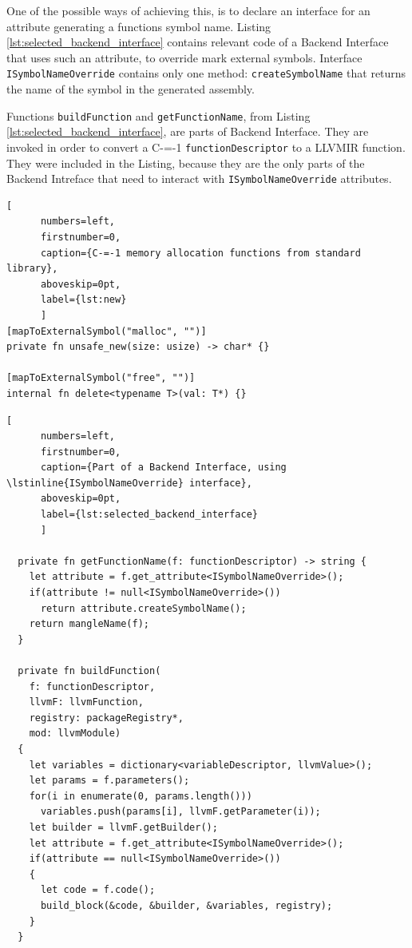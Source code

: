 One of the possible ways of achieving this, is to declare an interface for an attribute generating a functions symbol name.
Listing \ref{lst:selected_backend_interface} contains relevant code of a Backend Interface that uses such an attribute, to override mark external symbols.
Interface \lstinline{ISymbolNameOverride} contains only one method: \lstinline{createSymbolName} that returns the name of the symbol in the generated assembly.

Functions \lstinline{buildFunction} and \lstinline{getFunctionName}, from Listing \ref{lst:selected_backend_interface}, are parts of Backend Interface.
They are invoked in order to convert a C-=-1 \lstinline{functionDescriptor} to a LLVMIR function.
They were included in the Listing, because they are the only parts of the Backend Intreface that need to interact with \lstinline{ISymbolNameOverride} attributes.

\begin{minipage}{\linewidth}

	\begin{lstlisting}[
	  numbers=left,
	  firstnumber=0,
	  caption={C-=-1 memory allocation functions from standard library},
	  aboveskip=0pt,
	  label={lst:new}
	  ]
[mapToExternalSymbol("malloc", "")]
private fn unsafe_new(size: usize) -> char* {}

[mapToExternalSymbol("free", "")]
internal fn delete<typename T>(val: T*) {}

  \end{lstlisting}
\end{minipage}


\begin{minipage}{\linewidth}

	\begin{lstlisting}[
	  numbers=left,
	  firstnumber=0,
	  caption={Part of a Backend Interface, using \lstinline{ISymbolNameOverride} interface},
	  aboveskip=0pt,
	  label={lst:selected_backend_interface}
	  ]

  private fn getFunctionName(f: functionDescriptor) -> string {
	let attribute = f.get_attribute<ISymbolNameOverride>();
	if(attribute != null<ISymbolNameOverride>())
	  return attribute.createSymbolName();
	return mangleName(f);
  }

  private fn buildFunction(
	f: functionDescriptor,
	llvmF: llvmFunction,
	registry: packageRegistry*,
	mod: llvmModule)
  {
	let variables = dictionary<variableDescriptor, llvmValue>();
	let params = f.parameters();
	for(i in enumerate(0, params.length()))
	  variables.push(params[i], llvmF.getParameter(i));
	let builder = llvmF.getBuilder();
	let attribute = f.get_attribute<ISymbolNameOverride>();
	if(attribute == null<ISymbolNameOverride>())
	{
	  let code = f.code();
	  build_block(&code, &builder, &variables, registry);
	}
  }

  \end{lstlisting}
\end{minipage}


